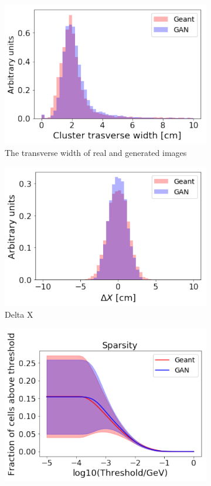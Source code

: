 \begin{figure}
\begin{subfigure}{0.19\textwidth}
    \includegraphics[width=1\textwidth]{figures/width.pdf}
    \caption{The transverse width of real and generated images}
  \end{subfigure}
  \begin{subfigure}{0.19\textwidth}
    \centering
    \includegraphics[width=1\textwidth]{figures/deltaX.pdf}
    \caption{Delta X}
  \end{subfigure}
  \begin{subfigure}{0.19\textwidth}
    \centering
    \includegraphics[width=1\textwidth]{figures/sparsity.pdf}

\end{subfigure}
\end{figure}
